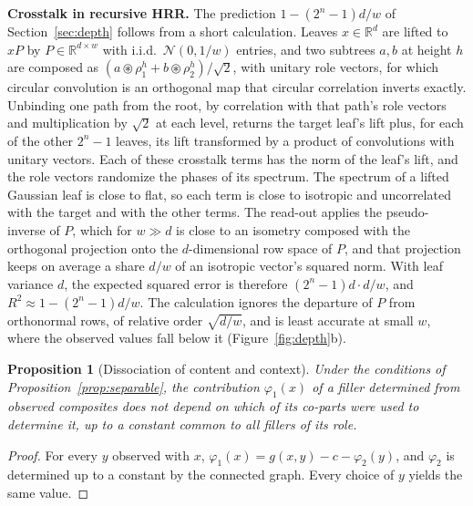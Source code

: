 \documentclass[10pt]{article}
\theoremstyle{plain}
\newtheorem{proposition}{Proposition}
\theoremstyle{remark}
\newcommand{\R}{\mathbb{R}}
\begin{document}
\noindent
\textbf{Crosstalk in recursive HRR.} The prediction $1 - (2^n - 1)d/w$ of Section~\ref{sec:depth} follows from a short calculation. Leaves $x \in \R^d$ are lifted to $xP$ by $P \in \R^{d \times w}$ with i.i.d.\ $\mathcal{N}(0, 1/w)$ entries, and two subtrees $a, b$ at height $h$ are composed as $(a \circledast \rho^h_1 + b \circledast \rho^h_2)/\sqrt{2}$, with unitary role vectors, for which circular convolution is an orthogonal map that circular correlation inverts exactly. Unbinding one path from the root, by correlation with that path's role vectors and multiplication by $\sqrt{2}$ at each level, returns the target leaf's lift plus, for each of the other $2^n - 1$ leaves, its lift transformed by a product of convolutions with unitary vectors. Each of these crosstalk terms has the norm of the leaf's lift, and the role vectors randomize the phases of its spectrum. The spectrum of a lifted Gaussian leaf is close to flat, so each term is close to isotropic and uncorrelated with the target and with the other terms. The read-out applies the pseudo-inverse of $P$, which for $w \gg d$ is close to an isometry composed with the orthogonal projection onto the $d$-dimensional row space of $P$, and that projection keeps on average a share $d/w$ of an isotropic vector's squared norm. With leaf variance $d$, the expected squared error is therefore $(2^n - 1)d \cdot d/w$, and $R^2 \approx 1 - (2^n - 1)d/w$. The calculation ignores the departure of $P$ from orthonormal rows, of relative order $\sqrt{d/w}$, and is least accurate at small $w$, where the observed values fall below it (Figure~\ref{fig:depth}b).

\begin{proposition}[Dissociation of content and context]
\label{prop:context}
Under the conditions of Proposition~\ref{prop:separable}, the contribution $\varphi_1(x)$ of a filler determined from observed composites does not depend on which of its co-parts were used to determine it, up to a constant common to all fillers of its role.
\end{proposition}

\begin{proof}
For every $y$ observed with $x$, $\varphi_1(x) = g(x, y) - c - \varphi_2(y)$, and $\varphi_2$ is determined up to a constant by the connected graph. Every choice of $y$ yields the same value.
\end{proof}
\end{document}

